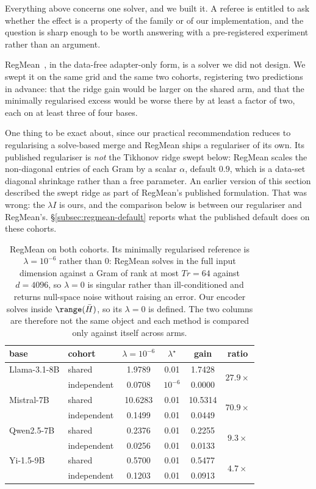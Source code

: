 Everything above concerns one solver, and we built it. A referee is
entitled to ask whether the effect is a property of the family or of our
implementation, and the question is sharp enough to be worth answering
with a pre-registered experiment rather than an argument.

RegMean~\citep{jin2023regmean}, in the data-free adapter-only form, is a
solver we did not design. We swept it on the same grid and the same two
cohorts, registering two predictions in advance: that the ridge gain would
be larger on the shared arm, and that the minimally regularised excess
would be worse there by at least a factor of two, each on at least three of
four bases.

One thing to be exact about, since our practical recommendation reduces to
regularising a solve-based merge and RegMean ships a regulariser of its
own. Its published regulariser is \emph{not} the Tikhonov ridge swept
below: RegMean scales the non-diagonal entries of each Gram by a scalar
$\alpha$, default $0.9$, which is a data-set diagonal shrinkage rather than
a free parameter. An earlier version of this section described the swept
ridge as part of RegMean's published formulation. That was wrong: the
$\lambda I$ is ours, and the comparison below is between our regulariser
and RegMean's. \S\ref{subsec:regmean-default} reports what the published
default does on these cohorts.

\begin{table}[t]
\centering
\small
\caption{RegMean on both cohorts. Its minimally regularised reference is
$\lambda = 10^{-6}$ rather than $0$: RegMean solves in the full input
dimension against a Gram of rank at most $Tr = 64$ against $d = 4096$, so
$\lambda = 0$ is singular rather than ill-conditioned and returns
null-space noise without raising an error. Our encoder solves inside
$\range(\bar H)$, so its $\lambda = 0$ is defined. The two columns are
therefore not the same object and each method is compared only against
itself across arms.}
\label{tab:regmean}
\begin{tabular}{llcccc}
\toprule
base & cohort & $\lambda = 10^{-6}$ & $\lambda^\star$ & gain & ratio \\
\midrule
Llama-3.1-8B & shared      & 1.9789 & 0.01 & 1.7428 & \multirow{2}{*}{$27.9\times$} \\
             & independent & 0.0708 & $10^{-6}$ & 0.0000 & \\
\addlinespace
Mistral-7B   & shared      & 10.6283 & 0.01 & 10.5314 & \multirow{2}{*}{$70.9\times$} \\
             & independent & 0.1499 & 0.01 & 0.0449 & \\
\addlinespace
Qwen2.5-7B   & shared      & 0.2376 & 0.01 & 0.2255 & \multirow{2}{*}{$9.3\times$} \\
             & independent & 0.0256 & 0.01 & 0.0133 & \\
\addlinespace
Yi-1.5-9B    & shared      & 0.5700 & 0.01 & 0.5477 & \multirow{2}{*}{$4.7\times$} \\
             & independent & 0.1203 & 0.01 & 0.0913 & \\
\bottomrule
\end{tabular}
\end{table}

